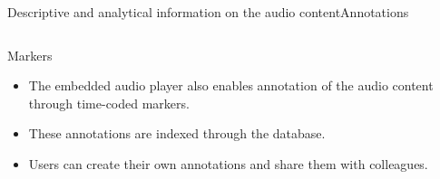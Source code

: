 \documentclass[final, hyperref, table]{beamer}
\begin{document}
\begin{frame}{Descriptive and analytical information on the audio content}{Annotations}%
  \begin{columns}[T]
    \begin{column}{0.6\textwidth}
      \begin{block}{Markers}%
        \begin{itemize}
        \item The embedded audio player also enables annotation of the
          audio content through \alert{time-coded markers}.
        \item These annotations are \alert{indexed through the database}.

        \item Users can create their own annotations and \alert{share} them with colleagues.
   
        \end{itemize}

      \end{block}
    \end{column}


\end{columns}
\end{frame}
\end{document}
